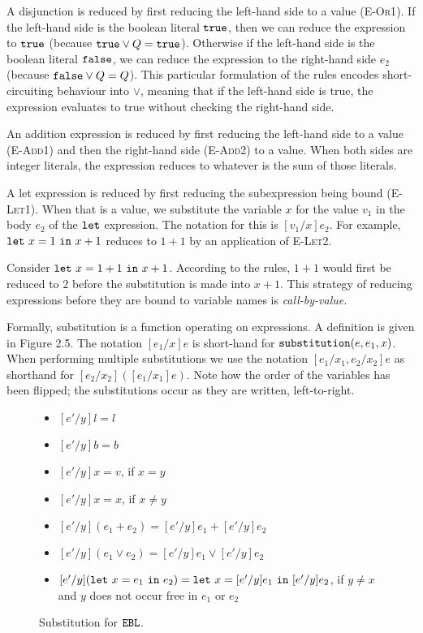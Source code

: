 A disjunction is reduced by first reducing the left-hand side to a value (\textsc{E-Or1}). If the left-hand side is the boolean literal $\mathtt{true}$, then we can reduce the expression to $\mathtt{true}$ (because $\mathtt{true} \lor Q = \mathtt{true}$). Otherwise if the left-hand side is the boolean literal $\mathtt{false}$, we can reduce the expression to the right-hand side $e_2$ (because $\mathtt{false} \lor Q = Q$). This particular formulation of the rules encodes short-circuiting behaviour into $\lor$, meaning that if the left-hand side is true, the expression evaluates to true without checking the right-hand side.

An addition expression is reduced by first reducing the left-hand side to a value (\textsc{E-Add1}) and then the right-hand side (\textsc{E-Add2}) to a value. When both sides are integer literals, the expression reduces to whatever is the sum of those literals.

A let expression is reduced by first reducing the subexpression being bound (\textsc{E-Let1}). When that is a value, we substitute the variable $x$ for the value $v_1$ in the body $e_2$ of the $\mathtt{let}$ expression. The notation for this is $[v_1/x]e_2$. For example, $\mathtt{let}~ x = 1~\mathtt{in}~ x+1$ reduces to $1+1$ by an application of \textsc{E-Let2}.

Consider $\mathtt{let}~ x = 1+1~\mathtt{in}~ x+1$. According to the rules, $1+1$ would first be reduced to $2$ before the substitution is made into $x+1$. This strategy of reducing expressions before they are bound to variable names is \textit{call-by-value}. 

Formally, substitution is a function operating on expressions. A definition is given in Figure 2.5. The notation $[e_1/x]e$ is short-hand for $\mathtt{substitution}(e, e_1, x)$. When performing multiple substitutions we use the notation $[e_1/x_1, e_2/x_2] e$ as shorthand for $[e_2/x_2]([e_1/x_1] e)$. Note how the order of the variables has been flipped; the substitutions occur as they are written, left-to-right.

\begin{figure}[h]


\begin{itemize}
	\setlength\itemsep{-0.7em}
	\item[] $[e'/y]l = l$
	\item[] $[e'/y]b = b$ 
	\item[] $[e'/y]x =  v$, if $x = y$
	\item[] $[e'/y]x = x$, if $x \neq y$
	\item[] $[e'/y](e_1 + e_2) = [e'/y]e_1 + [e'/y]e_2$
	\item[] $[e'/y](e_1 \lor e_2) = [e'/y]e_1 \lor [e'/y]e_2$
	\item[] $[e'/y](\mathtt{let}~ x = e_1~\mathtt{in}~ e_2) = \mathtt{let}~ x = [e'/y]e_1~\mathtt{in}~ [e'/y]e_2$, if $y \neq x$ and $y$ does not occur free in $e_1$ or $e_2$
\end{itemize}

\vspace{-12pt}
\caption{Substitution for $\mathtt{EBL}$.}
\label{This is the label.}
\end{figure}

